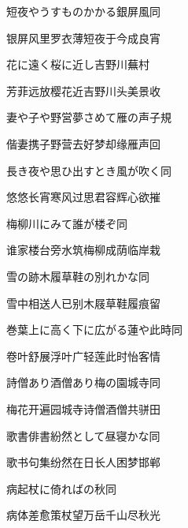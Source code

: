 \begin{haiku}
    {\FH 短夜やうすものかかる銀屏風}\hfill{\FH 同}

    {\FK 银屏风里罗衣薄短夜于今成良宵}
\end{haiku}

\begin{haiku}
    {\FH 花に遠く桜に近し吉野川}\hfill{\FH 蕪村}

    {\FK 芳菲远放樱花近吉野川头美景收}
\end{haiku}

\begin{haiku}
    {\FH 妻や子や野営夢さめて雁の声}\hfill{\FH 子規}

    {\FK 偕妻携子野营去好梦却缘雁声回}
\end{haiku}

\begin{haiku}
    {\FH 長き夜や思ひ出すとき風が吹く}\hfill{\FH 同}

    {\FK 悠悠长宵寒风过思君容辉心欲摧}
\end{haiku}

\begin{haiku}
    {\FH 梅柳川にみて誰が楼ぞ}\hfill{\FH 同}

    {\FK 谁家楼台旁水筑梅柳成荫临岸栽}
\end{haiku}

\begin{haiku}
    {\FH 雪の跡木履草鞋の別れかな}\hfill{\FH 同}

    {\FK 雪中相送人已别木屐草鞋履痕留}
\end{haiku}

\begin{haiku}
    {\FH 巻葉上に高く下に広がる蓮や此時}\hfill{\FH 同}

    {\FK 卷叶舒展浮叶广轻莲此时怡客情}
\end{haiku}

\begin{haiku}
    {\FH 詩僧あり酒僧あり梅の園城寺}\hfill{\FH 同}

    {\FK 梅花开遍园城寺诗僧酒僧共骈田}
\end{haiku}

\begin{haiku}
    {\FH 歌書俳書紛然として昼寝かな}\hfill{\FH 同}

    {\FK 歌书句集纷然在日长人困梦邯郸}
\end{haiku}

\begin{haiku}
    {\FH 病起杖に倚ればの秋}\hfill{\FH 同}

    {\FK 病体差愈策杖望万岳千山尽秋光}
\end{haiku}

